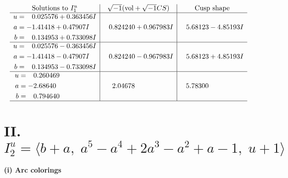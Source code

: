 \documentclass[1p]{elsarticle_modified}
\theoremstyle{definition}
\newcommand{\I}{\sqrt{-1}}
\begin{document}
$$\begin{array}{c|c|c}
\text{Solutions to }I^u_{1}& \I (\text{vol} + \sqrt{-1}CS) & \text{Cusp shape}\\
 \hline 
\begin{aligned}
u &= \phantom{-}0.025576 + 0.363456 I \\
a &= -1.41418 + 0.47907 I \\
b &= \phantom{-}0.134953 + 0.733098 I\end{aligned}
 & \phantom{-}0.824240 + 0.967983 I & \phantom{-}5.68123 - 4.85193 I \\ \hline\begin{aligned}
u &= \phantom{-}0.025576 - 0.363456 I \\
a &= -1.41418 - 0.47907 I \\
b &= \phantom{-}0.134953 - 0.733098 I\end{aligned}
 & \phantom{-}0.824240 - 0.967983 I & \phantom{-}5.68123 + 4.85193 I \\ \hline\begin{aligned}
u &= \phantom{-}0.260469\phantom{ +0.000000I} \\
a &= -2.68640\phantom{ +0.000000I} \\
b &= \phantom{-}0.794640\phantom{ +0.000000I}\end{aligned}
 & \phantom{-}2.04678\phantom{ +0.000000I} & \phantom{-}5.78300\phantom{ +0.000000I}\\
 \hline 
 \end{array}$$\newpage\newpage\renewcommand{\arraystretch}{1}
\centering \section*{II. $I^u_{2}= \langle b+a,\;a^5- a^4+2 a^3- a^2+a-1,\;u+1 \rangle$}
\flushleft \textbf{(i) Arc colorings}\\
\end{document}
